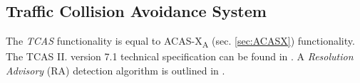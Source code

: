 \subsection{Traffic Collision Avoidance System}\label{sec:TCAS}

\noindent The \emph{TCAS} functionality is equal to ACAS-X\textsubscript{A} (sec. \ref{sec:ACASX}) functionality. The TCAS II. version 7.1 technical specification can be found in \cite{federal2011introduction}. A \emph{Resolution Advisory} (RA) detection algorithm is outlined in  \cite{munoz2013tcas}.